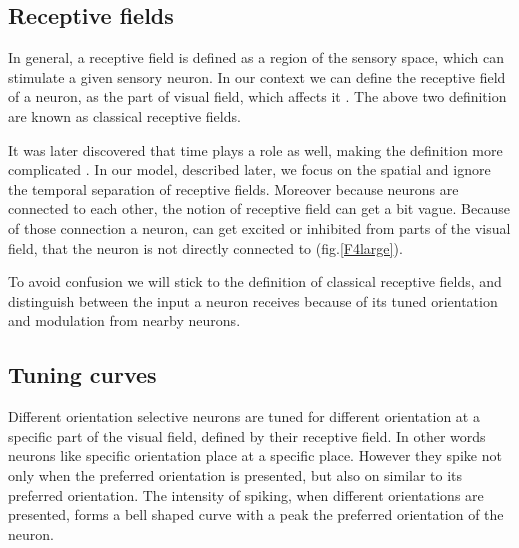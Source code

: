 \subsection{Receptive fields}

In general, a receptive field is defined as a region of the sensory space, which can stimulate a given sensory neuron. In our context we can define the receptive field of a neuron, as the part of visual field, which affects it \cite{Hartline700}. The above two definition are known as classical receptive fields.

It was later discovered that time plays a role as well, making the definition more complicated \cite{deangelis1995receptive}. In our model, described later, we focus on the spatial and ignore the temporal separation of receptive fields. Moreover because neurons are connected to each other, the notion of receptive field can get a bit vague. Because of those connection a neuron, can get excited or inhibited from parts of the visual field, that the neuron is not directly connected to (fig.\ref{F4large}).

To avoid confusion we will stick to the definition of classical receptive fields, and distinguish between the input a neuron receives because of its tuned orientation and modulation from nearby neurons.


\subsection{Tuning curves}

Different orientation selective neurons are tuned for different orientation at a specific part of the visual field, defined by their receptive field. In other words neurons like specific orientation place at a specific place. However they spike not only when the preferred orientation is presented, but also on similar to its preferred orientation. The intensity of spiking, when different orientations are presented, forms a bell shaped curve with a peak the preferred orientation of the neuron. 

